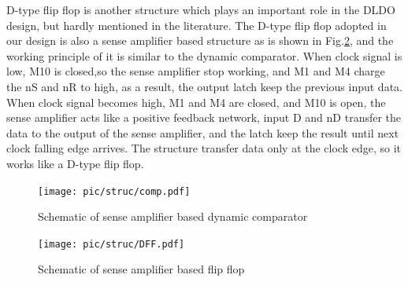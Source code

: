 \documentclass[journal]{IEEEtran}
\begin{document}
D-type flip flop is another structure which plays an important role in the DLDO design, but hardly mentioned in the literature. The D-type flip flop adopted in our design is also a sense amplifier based structure as is shown in Fig.\ref{fig:DFF}, and the working principle of it is similar to the dynamic comparator.  When clock signal is low, M10 is closed,so the sense amplifier stop working, and M1 and M4 charge the nS and nR to high, as a result, the output latch keep the previous input data. When clock signal becomes high, M1 and M4 are closed, and M10 is open, the sense amplifier acts like a positive feedback network, input D and nD transfer the data to the output of the sense amplifier, and the latch keep the result until next clock falling edge arrives. The structure transfer data only at the clock edge, so it works like a D-type flip flop.
\begin{figure}[t!]
    \centering
    \texttt{[image: pic/struc/comp.pdf]}
    \caption{Schematic of sense amplifier based dynamic comparator}
    \label{fig:comp}
\end{figure}
\begin{figure}[t!]
    \centering
    \texttt{[image: pic/struc/DFF.pdf]}
    \caption{Schematic of sense amplifier based flip flop}
    \label{fig:DFF}
\end{figure}
\end{document}
